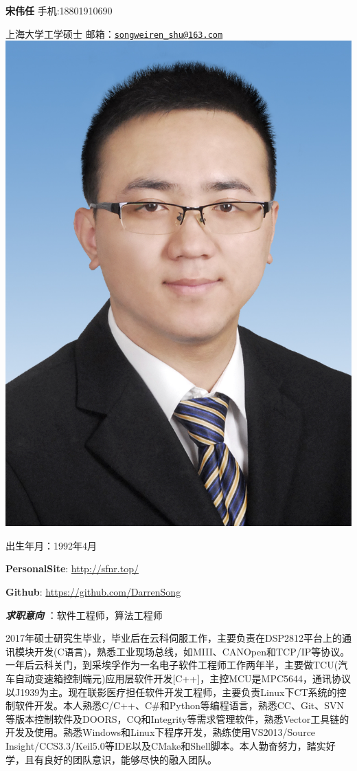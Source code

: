 \documentclass[
]{article}
\author{}
\date{}
\begin{document}
\begin{CJK}{UTF8}{gbsn}
\textbf{宋伟任} 手机:18801910690

上海大学\textbar 工学硕士
邮箱：\href{mailto:songweiren_shu@163.com}{\nolinkurl{songweiren\_shu@163.com}}
\includegraphics{./image/header.jpg}

出生年月：1992年4月

\textbf{PersonalSite}: \url{http://sfnr.top/}

\textbf{Github}: \url{https://github.com/DarrenSong}

\emph{\textbf{求职意向}} ：软件工程师，算法工程师

2017年硕士研究生毕业，毕业后在云科伺服工作，主要负责在DSP2812平台上的通讯模块开发(C语言)，熟悉工业现场总线，如MIII、CANOpen和TCP/IP等协议。一年后云科关门，到采埃孚作为一名电子软件工程师工作两年半，主要做TCU(汽车自动变速箱控制端元)应用层软件开发{[}C++{]}，主控MCU是MPC5644，通讯协议以J1939为主。现在联影医疗担任软件开发工程师，主要负责Linux下CT系统的控制软件开发。本人熟悉C/C++、C\#和Python等编程语言，熟悉CC、Git、SVN等版本控制软件及DOORS，CQ和Integrity等需求管理软件，熟悉Vector工具链的开发及使用。熟悉Windows和Linux下程序开发，熟练使用VS2013/Source
Insight/CCS3.3/Keil5.0等IDE以及CMake和Shell脚本。本人勤奋努力，踏实好学，且有良好的团队意识，能够尽快的融入团队。


\end{CJK}
\end{document}
